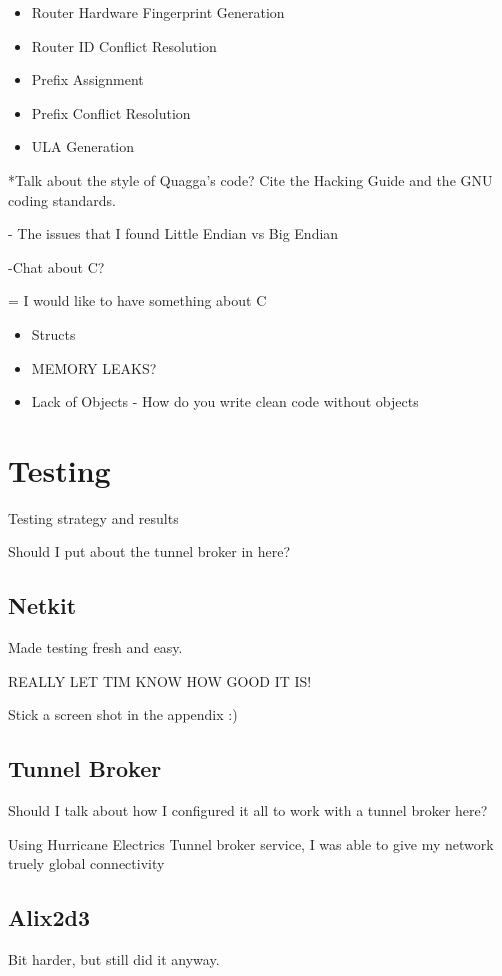 \documentclass[12pt]{report}
\begin{document}
\begin{itemize}
  \item Router Hardware Fingerprint Generation
  \item Router ID Conflict Resolution
  \item Prefix Assignment
  \item Prefix Conflict Resolution
  \item ULA Generation
\end{itemize} 

*Talk about the style of Quagga's code?
Cite the Hacking Guide and the GNU coding standards.

- The issues that I found
    Little Endian vs Big Endian
    
-Chat about C?

= I would like to have something about C

\begin{itemize}
  \item Structs
  \item MEMORY LEAKS?
  \item Lack of Objects - How do you write clean code without objects
\end{itemize}

\chapter{Testing}
Testing strategy and results

Should I put about the tunnel broker in here?

\section{Netkit} 
Made testing fresh and easy. 

REALLY LET TIM KNOW HOW GOOD IT IS!

Stick a screen shot in the appendix :)

\section{Tunnel Broker}
Should I talk about how I configured it all to work with a tunnel broker here?

Using Hurricane Electrics Tunnel broker service, I was able to give my network
truely global connectivity

\section{Alix2d3}
Bit harder, but still did it anyway.
\end{document}
